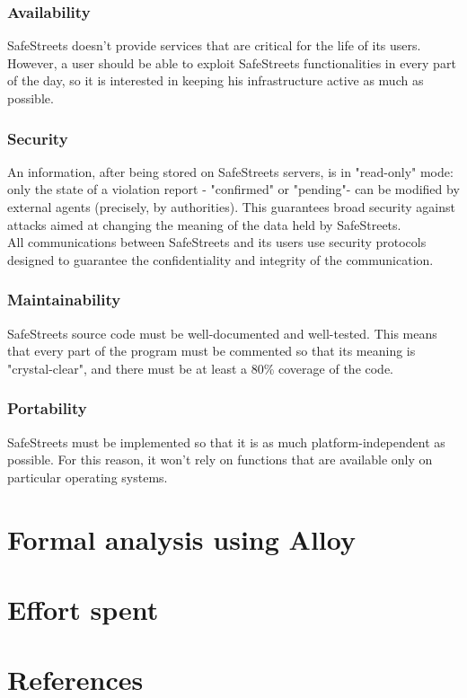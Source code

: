 \documentclass{article}
\begin{document}
			\subsubsection{Availability}
			SafeStreets doesn't provide services that are critical for the life of its users. However, a user should be able to exploit SafeStreets functionalities in every part of the day, so it is interested in keeping his infrastructure active as much as possible.
			
			\subsubsection{Security}
			An information, after being stored on SafeStreets servers, is in "read-only" mode: only the state of a violation report - "confirmed" or "pending"- can be modified by external agents (precisely, by authorities). This guarantees broad security against attacks aimed at changing the meaning of the data held by SafeStreets.\\
			All communications between SafeStreets and its users use security protocols designed to guarantee the confidentiality and integrity of the communication.
			
			\subsubsection{Maintainability}
			SafeStreets source code must be well-documented and well-tested. This means that every part of the program must be commented so that its meaning is "crystal-clear", and there must be at least a 80\% coverage of the code.
			
			\subsubsection{Portability}
			SafeStreets must be implemented so that it is as much platform-independent as possible. For this reason, it won't rely on functions that are available only on particular operating systems.
	
	\section{Formal analysis using Alloy}
	
	\section{Effort spent}
	
	\section{References}
	
\end{document}
